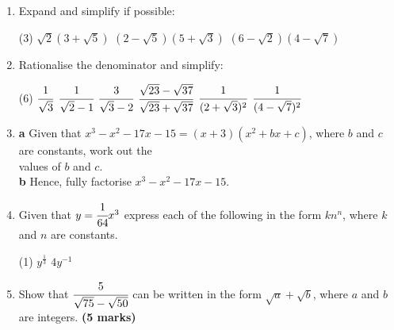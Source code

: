 \documentclass[fleqn]{article}
\begin{document}
\begin{enumerate}
    \item Expand and simplify if possible:
        \begin{tasks}(3) %
            \task $\sqrt{2}(3+\sqrt{5})$
            \task $(2-\sqrt{5})(5+\sqrt{3})$
            \task $(6-\sqrt{2})(4-\sqrt{7})$
        \end{tasks}
        
    \item Rationalise the denominator and simplify: \vspace{-2mm}
        \begin{tasks}(6) %
            \task $\cfrac{1}{\sqrt{3}}$
            \task $\cfrac{1}{\sqrt{2}-1}$
            \task $\cfrac{3}{\sqrt{3}-2}$
            \task $\cfrac{\sqrt{23}-\sqrt{37}}{\sqrt{23}+\sqrt{37}}$
            \task $\cfrac{1}{(2+\sqrt{3})^2}$
            \task $\cfrac{1}{(4-\sqrt{7})^2}$
        \end{tasks}
        
    \item \hspace*{2mm}\textbf{a}\hspace*{5mm} Given that $x^3-x^2-17x-15=(x+3)(x^2+bx+c)$, where $b$ and $c$ are constants, work out the \\\hspace*{9mm} values of $b$ and $c$.\vspace{1mm}\\
          \hspace*{2mm}\textbf{b}\hspace*{5mm} Hence, fully factorise $x^3-x^2-17x-15$.
    \newpage

    \item Given that $y=\cfrac{1}{64}x^3$ express each of the following in the form $kn^n$, where $k$ and $n$ are constants. \vspace{-2mm}
        \begin{tasks}(1)
            \task $y^{\textstyle\frac{1}{3}}$
            \task $4y^{-1}$
        \end{tasks}
        \vspace{-4mm}
        
    \item Show that $\cfrac{5}{\sqrt{75}-\sqrt{50}}$ can be written in the form $\sqrt{a}+\sqrt{b}$, where $a$ and $b$ are integers. \hfill\textbf{(5 marks)}
    

\end{enumerate}
\end{document}

